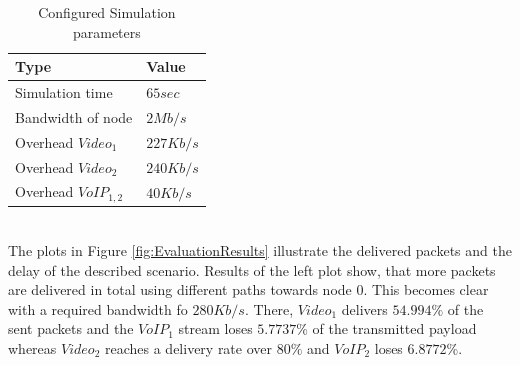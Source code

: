 \documentclass[runningheads]{llncs}
\newcommand{\VOIP}{VoIP}
\begin{document}
	\begin{table}
		\centering
		\caption{Configured Simulation parameters}
		\begin{tabular}{l|l} %
			\textbf{Type} & \textbf{Value} \\
			\hline
			Simulation time & $65sec$\\
			Bandwidth of  node & $2Mb/s$\\
			Overhead $Video_{1}$ & $227Kb/s$\\
			Overhead $Video_{2}$ & $240Kb/s$\\
			Overhead $VoIP_{1,2}$ & $40Kb/s$
		\end{tabular}
	\label{tab:ScenarioParameters}
	\end{table}\\
	 The plots in Figure \ref{fig:EvaluationResults} illustrate the delivered packets and the delay of the described scenario. Results of the left plot show, that more packets are delivered in total using different paths towards node 0. This becomes clear with a required bandwidth fo $280Kb/s$. There, $Video_1$ delivers $54.994\%$ of the sent packets and the $\VOIP{}_1$ stream loses $5.7737\%$ of the transmitted payload whereas $Video_2$ reaches a delivery rate over $80\%$ and $\VOIP{}_2$ loses $6.8772\%$.
\end{document}
